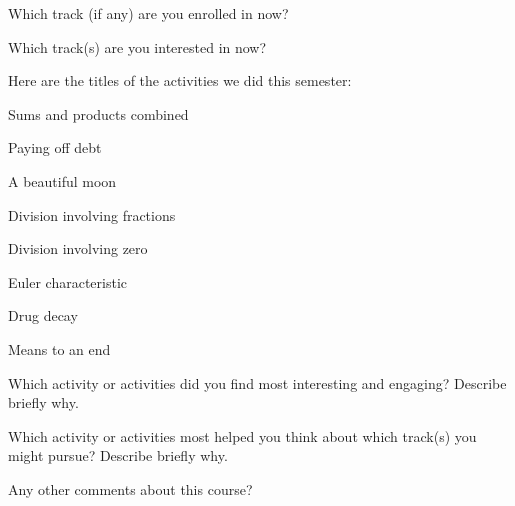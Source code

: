 \documentclass[handout,nooutcomes,space]{ximera}
\begin{document}
\newpage 

\begin{question}
Which track (if any) are you enrolled in now?  
\begin{freeResponse}
\end{freeResponse}
\end{question}

\begin{question}
Which track(s) are you interested in now? 
\begin{freeResponse}
\end{freeResponse}
\end{question}

Here are the titles of the activities we did this semester:  
\begin{description}
\item Sums and products combined
\item Paying off debt
\item A beautiful moon
\item Division involving fractions
\item Division involving zero
\item Euler characteristic
\item Drug decay
\item Means to an end
\end{description}

\begin{question}
Which activity or activities did you find most interesting and engaging?  Describe briefly why.  
\begin{freeResponse}
\end{freeResponse}
\end{question}


\begin{question}
Which activity or activities most helped you think about which track(s) you might pursue?  Describe briefly why.  
\begin{freeResponse}
\end{freeResponse}
\end{question}

\begin{question}
Any other comments about this course?  
\begin{freeResponse}
\end{freeResponse}
\end{question}
\end{document}
